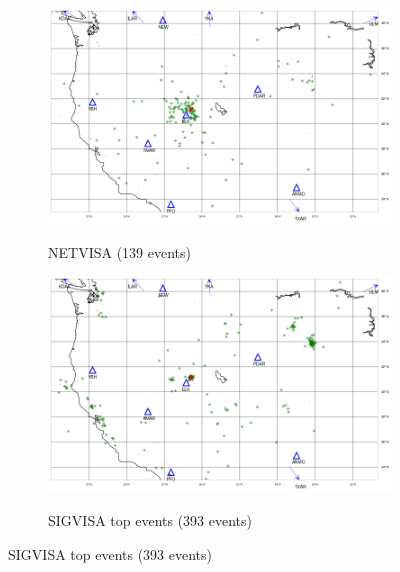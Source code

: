 \documentclass[twoside]{article} \usepackage{aistats2017}
\begin{document}
\begin{figure}
\centering
\begin{subfigure}[b]{0.30\textwidth}
  {\includegraphics[width=\textwidth]{visa_map}}
\caption{NETVISA (139 events)}
\label{fig:visa_map}
\end{subfigure}
\begin{subfigure}[b]{0.30\textwidth}
  {\includegraphics[width=\textwidth]{sigvisa_top_map}}
\caption{SIGVISA top events (393 events)}

\end{subfigure}
\end{figure}
\end{document}
